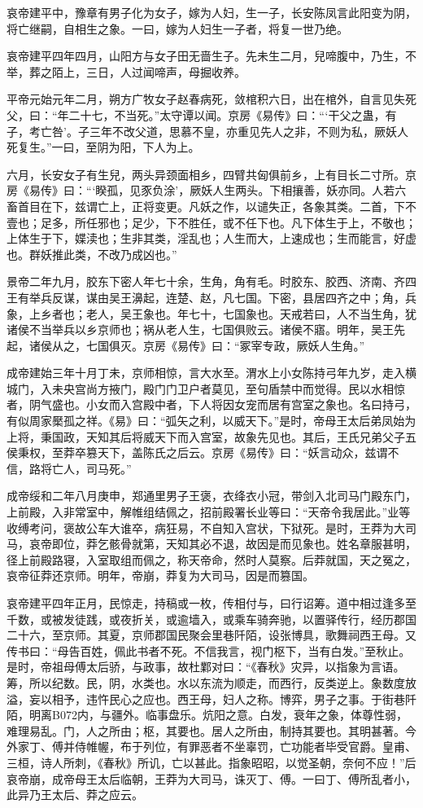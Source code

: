 \documentclass[]{article}
\begin{document}
哀帝建平中，豫章有男子化为女子，嫁为人妇，生一子，长安陈凤言此阳变为阴，将亡继嗣，自相生之象。一曰，嫁为人妇生一子者，将复一世乃绝。

哀帝建平四年四月，山阳方与女子田无啬生子。先未生二月，兒啼腹中，乃生，不举，葬之陌上，三日，人过闻啼声，母掘收养。

平帝元始元年二月，朔方广牧女子赵春病死，敛棺积六日，出在棺外，自言见失死父，曰：``年二十七，不当死。''太守谭以闻。京房《易传》曰：```干父之蛊，有子，考亡咎'。子三年不改父道，思慕不皇，亦重见先人之非，不则为私，厥妖人死复生。''一曰，至阴为阳，下人为上。

六月，长安女子有生兒，两头异颈面相乡，四臂共匈俱前乡，上有目长二寸所。京房《易传》曰：```睽孤，见豕负涂'，厥妖人生两头。下相攘善，妖亦同。人若六畜首目在下，兹谓亡上，正将变更。凡妖之作，以谴失正，各象其类。二首，下不壹也；足多，所任邪也；足少，下不胜任，或不任下也。凡下体生于上，不敬也；上体生于下，媟渎也；生非其类，淫乱也；人生而大，上速成也；生而能言，好虚也。群妖推此类，不改乃成凶也。''

景帝二年九月，胶东下密人年七十余，生角，角有毛。时胶东、胶西、济南、齐四王有举兵反谋，谋由吴王濞起，连楚、赵，凡七国。下密，县居四齐之中；角，兵象，上乡者也；老人，吴王象也。年七十，七国象也。天戒若曰，人不当生角，犹诸侯不当举兵以乡京师也；祸从老人生，七国俱败云。诸侯不寤。明年，吴王先起，诸侯从之，七国俱灭。京房《易传》曰：``冢宰专政，厥妖人生角。''

成帝建始三年十月丁未，京师相惊，言大水至。渭水上小女陈持弓年九岁，走入横城门，入未央宫尚方掖门，殿门门卫户者莫见，至句盾禁中而觉得。民以水相惊者，阴气盛也。小女而入宫殿中者，下人将因女宠而居有宫室之象也。名曰持弓，有似周家檿孤之祥。《易》曰：``弧矢之利，以威天下。''是时，帝母王太后弟凤始为上将，秉国政，天知其后将威天下而入宫室，故象先见也。其后，王氏兄弟父子五侯秉权，至莽卒篡天下，盖陈氏之后云。京房《易传》曰：``妖言动众，兹谓不信，路将亡人，司马死。''

成帝绥和二年八月庚申，郑通里男子王褒，衣绛衣小冠，带剑入北司马门殿东门，上前殿，入非常室中，解帷组结佩之，招前殿署长业等曰：``天帝令我居此。''业等收缚考问，褒故公车大谁卒，病狂易，不自知入宫状，下狱死。是时，王莽为大司马，哀帝即位，莽乞骸骨就第，天知其必不退，故因是而见象也。姓名章服甚明，径上前殿路寝，入室取组而佩之，称天帝命，然时人莫察。后莽就国，天之冤之，哀帝征莽还京师。明年，帝崩，莽复为大司马，因是而篡国。

哀帝建平四年正月，民惊走，持稿或一枚，传相付与，曰行诏筹。道中相过逢多至千数，或被发徒践，或夜折关，或逾墙入，或乘车骑奔驰，以置驿传行，经历郡国二十六，至京师。其夏，京师郡国民聚会里巷阡陌，设张博具，歌舞祠西王母。又传书曰：``母告百姓，佩此书者不死。不信我言，视门枢下，当有白发。''至秋止。是时，帝祖母傅太后骄，与政事，故杜鄴对曰：``《春秋》灾异，以指象为言语。筹，所以纪数。民，阴，水类也。水以东流为顺走，而西行，反类逆上。象数度放溢，妄以相予，违忤民心之应也。西王母，妇人之称。博弈，男子之事。于街巷阡陌，明离B072内，与疆外。临事盘乐。炕阳之意。白发，衰年之象，体尊性弱，难理易乱。门，人之所由；枢，其要也。居人之所由，制持其要也。其明甚著。今外家丁、傅并侍帷幄，布于列位，有罪恶者不坐辜罚，亡功能者毕受官爵。皇甫、三桓，诗人所刺，《春秋》所讥，亡以甚此。指象昭昭，以觉圣朝，奈何不应！''后哀帝崩，成帝母王太后临朝，王莽为大司马，诛灭丁、傅。一曰丁、傅所乱者小，此异乃王太后、莽之应云。
\end{document}

